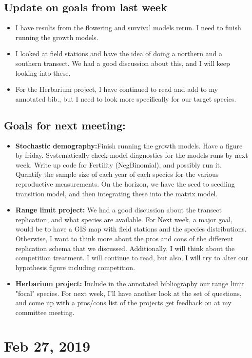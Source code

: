 \documentclass{article}
\begin{document}
\subsection*{Update on goals from last week}
\begin{itemize}
\item{I have results from the flowering and survival models rerun. I need to finish running the growth models.}
\item{I looked at field stations and have the idea of doing a northern and a southern transect. We had a good discussion about this, and I will keep looking into these.}
\item{For the Herbarium project, I have continued to read and add to my annotated bib., but I need to look more specifically for our target species.}
\end{itemize}

\subsection*{Goals for next meeting:}
\begin{itemize}
\item{\textbf{Stochastic demography:}Finish running the growth models. Have a figure by friday. Systematically check model diagnostics for the models runs by next week. Write up code for Fertility (NegBinomial), and possibly run it. Quantify the sample size of each year of each species for the various reproductive measurements. On the horizon, we have the seed to seedling transition model, and then integrating these into the matrix model.}
\item{\textbf{Range limit project:} We had a good discussion about the transect replication, and what species are available. For Next week, a major goal, would be to have a GIS map with field stations and the species distributions. Otherwise, I want to think more about the pros and cons of the different replication schema that we discussed. Additionally, I will think about the competition treatment. I will continue to read, but also, I will try to alter our hypothesis figure including competition.}
\item{\textbf{Herbarium project:} Include in the annotated bibliography our range limit "focal" species. For next week, I'll have another look at the set of questions, and come up with a pros/cons list of the projects get feedback on at my committee meeting.}
\end{itemize}
  
  
\section*{Feb 27, 2019}
\end{document}
